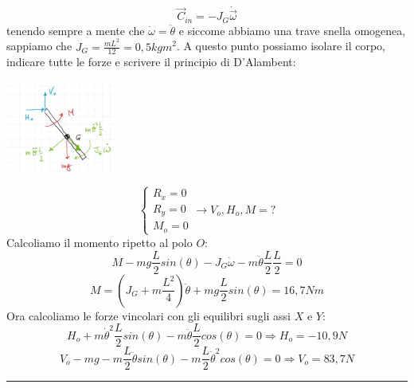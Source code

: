\[
    \vec{C}_{in} = - J_G \dot{\vec{\omega}}
\]
tenendo sempre a mente che $\dot{\omega} = \ddot{\theta}$ e siccome abbiamo una trave snella omogenea, sappiamo che $J_G = \frac{m L^2}{12} = 0,5 kg m^2$.\newline
\newline
A questo punto possiamo isolare il corpo, indicare tutte le forze e scrivere il principio di D'Alambent:
\begin{center}
    \includegraphics[height=3cm]{../lezione9/img7.JPG}
\end{center}
\[
    \begin{cases}
        R_x = 0\\
        R_y = 0\\
        M_o = 0
    \end{cases} \rightarrow V_o, H_o, M = ?
\]
Calcoliamo il momento ripetto al polo $O$:
\[
    M - mg \frac{L}{2}sin(\theta) - J_G \dot{\omega} - m \ddot{\theta} \frac{L}{2} \frac{L}{2} = 0
\]
\[
    M = \left(J_G + m \frac{L^2}{4}\right) \ddot{\theta} + mg \frac{L}{2} sin(\theta) = 16,7 Nm 
\]
Ora calcoliamo le forze vincolari con gli equilibri sugli assi $X$ e $Y$:
\[
    H_o + m \dot{\theta}^2 \frac{L}{2} sin(\theta) - m \ddot{\theta} \frac{L}{2} cos(\theta) = 0 \Rightarrow H_o = -10,9 N
\]
\[
    V_o - mg - m \frac{L}{2} \ddot{\theta} sin(\theta) - m \frac{L}{2}\dot{\theta}^2 cos(\theta) = 0 \Rightarrow V_o = 83,7N
\]
\rule{\textwidth}{0,4pt}
